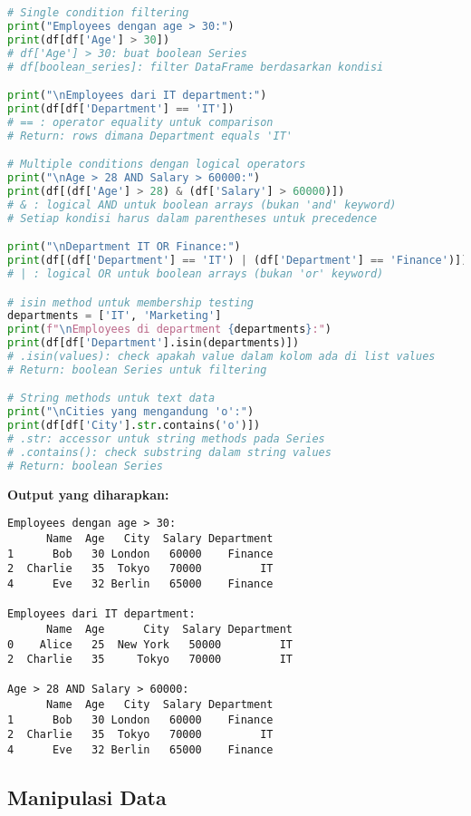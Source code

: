\begin{lstlisting}[language=python, caption={Boolean Indexing dan Filtering}, style=python]
# Single condition filtering
print("Employees dengan age > 30:")
print(df[df['Age'] > 30])
# df['Age'] > 30: buat boolean Series
# df[boolean_series]: filter DataFrame berdasarkan kondisi

print("\nEmployees dari IT department:")
print(df[df['Department'] == 'IT'])
# == : operator equality untuk comparison
# Return: rows dimana Department equals 'IT'

# Multiple conditions dengan logical operators
print("\nAge > 28 AND Salary > 60000:")
print(df[(df['Age'] > 28) & (df['Salary'] > 60000)])
# & : logical AND untuk boolean arrays (bukan 'and' keyword)
# Setiap kondisi harus dalam parentheses untuk precedence

print("\nDepartment IT OR Finance:")
print(df[(df['Department'] == 'IT') | (df['Department'] == 'Finance')])
# | : logical OR untuk boolean arrays (bukan 'or' keyword)

# isin method untuk membership testing
departments = ['IT', 'Marketing']
print(f"\nEmployees di department {departments}:")
print(df[df['Department'].isin(departments)])
# .isin(values): check apakah value dalam kolom ada di list values
# Return: boolean Series untuk filtering

# String methods untuk text data
print("\nCities yang mengandung 'o':")
print(df[df['City'].str.contains('o')])
# .str: accessor untuk string methods pada Series
# .contains(): check substring dalam string values
# Return: boolean Series
\end{lstlisting}

\textbf{Output yang diharapkan:}
\begin{lstlisting}[style=bash]
Employees dengan age > 30:
      Name  Age   City  Salary Department
1      Bob   30 London   60000    Finance
2  Charlie   35  Tokyo   70000         IT
4      Eve   32 Berlin   65000    Finance

Employees dari IT department:
      Name  Age      City  Salary Department
0    Alice   25  New York   50000         IT
2  Charlie   35     Tokyo   70000         IT

Age > 28 AND Salary > 60000:
      Name  Age   City  Salary Department
1      Bob   30 London   60000    Finance
2  Charlie   35  Tokyo   70000         IT
4      Eve   32 Berlin   65000    Finance
\end{lstlisting}

\subsection*{Manipulasi Data}

